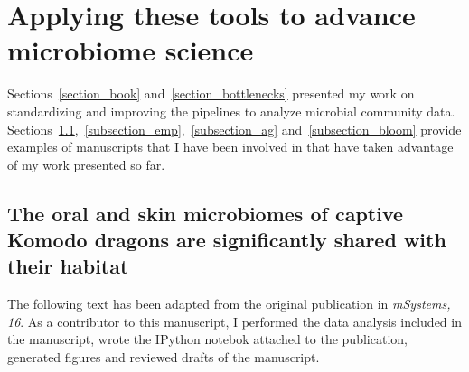 \section{Applying these tools to advance microbiome science}\label{section_contributions}

Sections~\ref{section_book} and~\ref{section_bottlenecks} presented my work
on standardizing and improving the pipelines to analyze microbial community data.
Sections~\ref{subsection_komodo},~\ref{subsection_emp},~\ref{subsection_ag}
and~\ref{subsection_bloom} provide examples of manuscripts that I have been
involved in that have taken advantage of my work presented so far.

\subsection{The oral and skin microbiomes of captive Komodo dragons are significantly shared with their habitat}\label{subsection_komodo}

The following text has been adapted from the original publication in
\textsl{mSystems, 16}. As a contributor to this manuscript, I performed the data
analysis included in the manuscript, wrote the IPython notebok \cite{Perez2007}
attached to the publication, generated figures and reviewed drafts of the manuscript.

